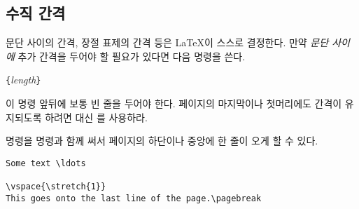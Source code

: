\subsection{수직 간격}

문단 사이의 간격, 장절 표제의 간격 등은 \LaTeX 이 스스로 결정한다.
만약 \emph{문단 사이에} 추가 간격을 두어야 할 필요가 있다면 다음 명령을 쓴다.

\begin{lscommand}
\verb|{|\emph{length}\verb|}|
\end{lscommand}

이 명령 앞뒤에 보통 빈 줄을 두어야 한다. 페이지의 마지막이나 첫머리에도 간격이 유지되도록 하려면  대신 를 사용하라.

 명령을  명령과 함께 써서 페이지의 하단이나 중앙에 한 줄이 오게 할 수 있다.
%

\begin{code}
\begin{verbatim}
Some text \ldots

\vspace{\stretch{1}}
This goes onto the last line of the page.\pagebreak
\end{verbatim}
\end{code}

